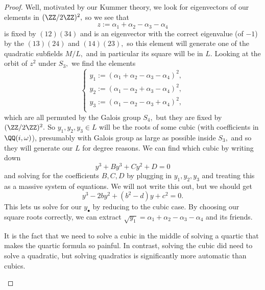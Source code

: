\begin{proof}
	Well, motivated by our Kummer theory, we look for eigenvectors of our elements in $(\ZZ/2\ZZ)^2,$ so we see that
	\[z:=\alpha_1+\alpha_2-\alpha_3-\alpha_4\]
	is fixed by $(12)(34)$ and is an eigenvector with the correct eigenvalue (of $-1$) by the $(13)(24)$ and $(14)(23),$ so this element will generate one of the quadratic subfields $M/L,$ and in particular its square will be in $L.$ Looking at the orbit of $z^2$ under $S_3,$ we find the elements
	\[\begin{cases}
		y_1:=(\alpha_1+\alpha_2-\alpha_3-\alpha_4)^2, \\
		y_2:=(\alpha_1-\alpha_2+\alpha_3-\alpha_4)^2, \\
		y_3:=(\alpha_1-\alpha_2-\alpha_3+\alpha_4)^2, \\
	\end{cases}\]
	which are all permuted by the Galois group $S_4,$ but they are fixed by $(\ZZ/2\ZZ)^2.$ So $y_1,y_2,y_3\in L$ will be the roots of some cubic (with coefficients in $\QQ(i,\omega)$), presumably with Galois group as large as possible inside $S_3,$ and so they will generate our $L$ for degree reasons. We can find which cubic by writing down
	\[y^3+By^3+Cy^2+D=0\]
	and solving for the coefficients $B,C,D$ by plugging in $y_1,y_2,y_3$ and treating this as a massive system of equations. We will not write this out, but we should get
	\[y^3-2by^2+\left(b^2-d\right)y+c^2=0.\]
	This lets us solve for our $y_\bullet$ by reducing to the cubic case. By choosing our square roots correctly, we can extract $\sqrt{y_1}=\alpha_1+\alpha_2-\alpha_3-\alpha_4$ and its friends.
	\begin{remark}[Nir]
		It is the fact that we need to solve a cubic in the middle of solving a quartic that makes the quartic formula so painful. In contrast, solving the cubic did need to solve a quadratic, but solving quadratics is significantly more automatic than cubics.
	\end{remark}
	

\end{proof}

